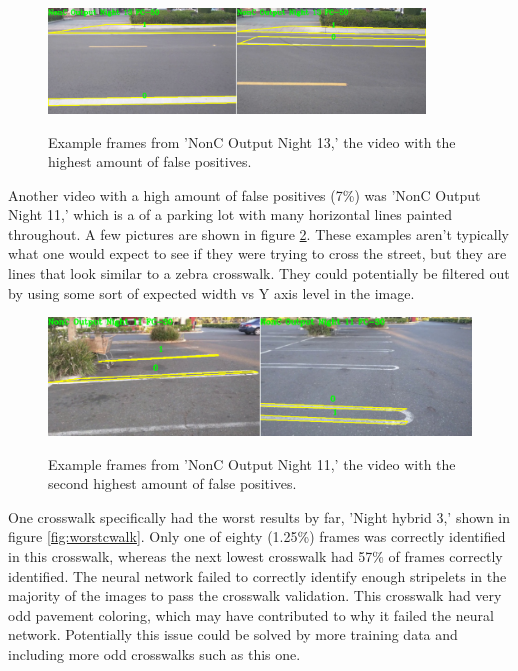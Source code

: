 \documentclass[12pt]{ucthesis}
\newcommand{\captionfonts}{\small\bf\ssp}
\begin{document}
\begin{figure}[t]
\begin{center}
\includegraphics[width=10cm]{NonCWorstCwalk.png}
\captionfonts
\caption[Worst False Positive Examples]{Example frames from 'NonC Output Night 13,' the video with the highest amount of false positives.}
\label{fig:worstFalsePosPic}
\end{center}
\end{figure}

Another video with a high amount of false positives (7\%) was 'NonC Output Night 11,' which is a of a parking lot with many horizontal lines painted throughout.  A few pictures are shown in figure \ref{fig:2ndworstFalsePosPic}. These examples aren't typically what one would expect to see if they were trying to cross the street, but they are lines that look similar to a zebra crosswalk. They could potentially be filtered out by using some sort of expected width vs Y axis level in the image. 

\begin{figure}[t]
\begin{center}
\includegraphics[width=14cm]{NonC2ndWorstCwalk.png}
\captionfonts
\caption[Second Worst False Positive Examples]{Example frames from 'NonC Output Night 11,' the video with the second highest amount of false positives.}
\label{fig:2ndworstFalsePosPic}
\end{center}
\end{figure}

One crosswalk specifically had the worst results by far, 'Night hybrid 3,' shown in figure \ref{fig:worstcwalk}. Only one of eighty (1.25\%) frames was correctly identified in this crosswalk, whereas the next lowest crosswalk had 57\% of frames correctly identified. The neural network failed to correctly identify enough stripelets in the majority of the images to pass the crosswalk validation. This crosswalk had very odd pavement coloring, which may have contributed to why it failed the neural network.  Potentially this issue could be solved by more training data and including more odd crosswalks such as this one. 
\end{document}
